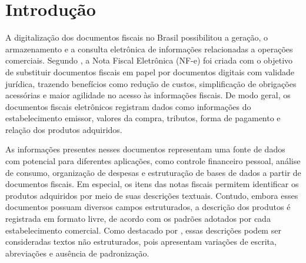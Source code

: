 \documentclass[english,brazilian]{UNISINOSmonografia}
\begin{document}
\listoffigures








\tableofcontents













\chapter{Introdução}

A digitalização dos documentos fiscais no Brasil possibilitou a geração, o armazenamento e a consulta eletrônica de informações relacionadas a operações comerciais. Segundo \cite{sefazrsnfe}, a Nota Fiscal Eletrônica (NF-e) foi criada com o objetivo de substituir documentos fiscais em papel por documentos digitais com validade jurídica, trazendo benefícios como redução de custos, simplificação de obrigações acessórias e maior agilidade no acesso às informações fiscais. De modo geral, os documentos fiscais eletrônicos registram dados como informações do estabelecimento emissor, valores da compra, tributos, forma de pagamento e relação dos produtos adquiridos.

As informações presentes nesses documentos representam uma fonte de dados com potencial para diferentes aplicações, como controle financeiro pessoal, análise de consumo, organização de despesas e estruturação de bases de dados a partir de documentos fiscais. Em especial, os itens das notas fiscais permitem identificar os produtos adquiridos por meio de suas descrições textuais. Contudo, embora esses documentos possuam diversos campos estruturados, a descrição dos produtos é registrada em formato livre, de acordo com os padrões adotados por cada estabelecimento comercial. Como destacado por \cite{santos2023classificacao}, essas descrições podem ser consideradas textos não estruturados, pois apresentam variações de escrita, abreviações e ausência de padronização.
\end{document}
